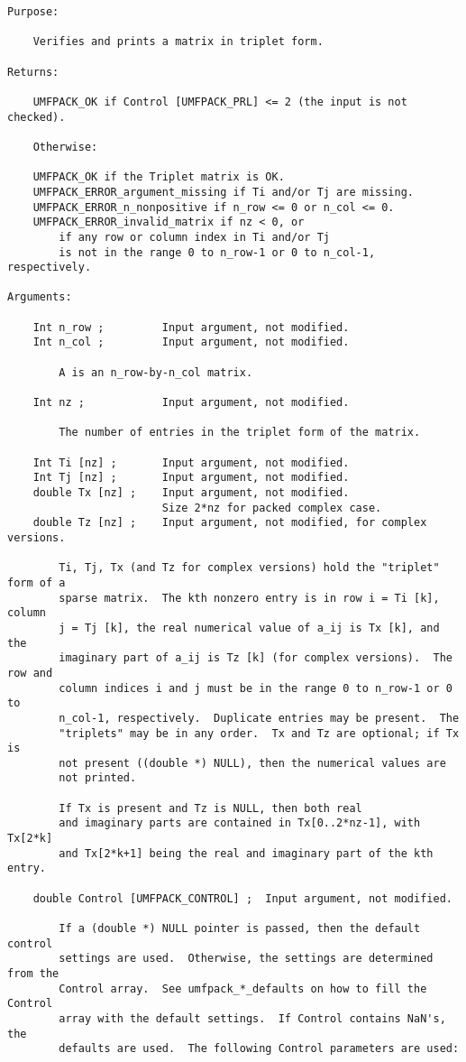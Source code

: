 \documentclass[11pt]{article}
\begin{document}
{\begin{verbatim}
Purpose:

    Verifies and prints a matrix in triplet form.

Returns:

    UMFPACK_OK if Control [UMFPACK_PRL] <= 2 (the input is not checked).

    Otherwise:

    UMFPACK_OK if the Triplet matrix is OK.
    UMFPACK_ERROR_argument_missing if Ti and/or Tj are missing.
    UMFPACK_ERROR_n_nonpositive if n_row <= 0 or n_col <= 0.
    UMFPACK_ERROR_invalid_matrix if nz < 0, or
        if any row or column index in Ti and/or Tj
        is not in the range 0 to n_row-1 or 0 to n_col-1, respectively.

Arguments:

    Int n_row ;         Input argument, not modified.
    Int n_col ;         Input argument, not modified.

        A is an n_row-by-n_col matrix.

    Int nz ;            Input argument, not modified.

        The number of entries in the triplet form of the matrix.

    Int Ti [nz] ;       Input argument, not modified.
    Int Tj [nz] ;       Input argument, not modified.
    double Tx [nz] ;    Input argument, not modified.
                        Size 2*nz for packed complex case.
    double Tz [nz] ;    Input argument, not modified, for complex versions.

        Ti, Tj, Tx (and Tz for complex versions) hold the "triplet" form of a
        sparse matrix.  The kth nonzero entry is in row i = Ti [k], column
        j = Tj [k], the real numerical value of a_ij is Tx [k], and the
        imaginary part of a_ij is Tz [k] (for complex versions).  The row and
        column indices i and j must be in the range 0 to n_row-1 or 0 to
        n_col-1, respectively.  Duplicate entries may be present.  The
        "triplets" may be in any order.  Tx and Tz are optional; if Tx is
        not present ((double *) NULL), then the numerical values are
        not printed.

        If Tx is present and Tz is NULL, then both real
        and imaginary parts are contained in Tx[0..2*nz-1], with Tx[2*k]
        and Tx[2*k+1] being the real and imaginary part of the kth entry.

    double Control [UMFPACK_CONTROL] ;  Input argument, not modified.

        If a (double *) NULL pointer is passed, then the default control
        settings are used.  Otherwise, the settings are determined from the
        Control array.  See umfpack_*_defaults on how to fill the Control
        array with the default settings.  If Control contains NaN's, the
        defaults are used.  The following Control parameters are used:


\end{verbatim}}
\end{document}
